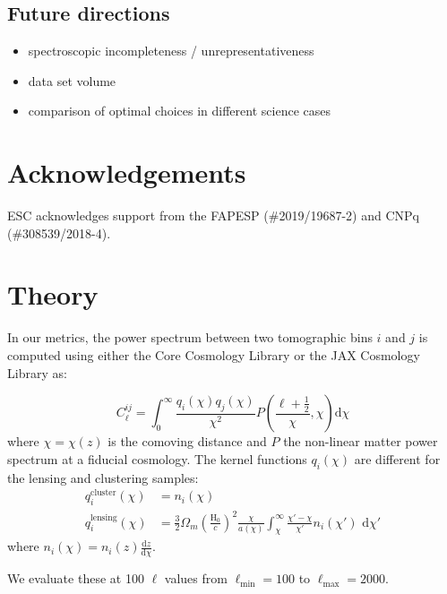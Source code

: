 \documentclass[twocolumn,twocolappendix]{aastex63}
\begin{document}
\subsection{Future directions}

\begin{itemize}
    \item spectroscopic incompleteness / unrepresentativeness
    \item data set volume
    \item comparison of optimal choices in different science cases
\end{itemize}


\section{Acknowledgements}
ESC acknowledges support from the FAPESP (\#2019/19687-2) and CNPq  (\#308539/2018-4).




\appendix

\section{Theory}\label{app:theory}

In our metrics, the power spectrum between two tomographic bins $i$ and $j$ is
computed using either the Core Cosmology Library \citep{ccl} or the JAX
Cosmology Library \citep{jax-cosmo} as:

\begin{equation}
    C^{ij}_\ell = \int_0^{\infty} \frac{q_i(\chi) q_j(\chi)}{\chi^2} P\left(\frac{\ell +\frac{1}{2}}{\chi}, \chi \right) \mathrm{d}\chi
\end{equation}
where $\chi = \chi(z)$ is the comoving distance and $P$ the non-linear matter power spectrum at
a fiducial cosmology.  The kernel functions $q_i(\chi)$ are different for the lensing and clustering samples:
\begin{align}
    q^{\mathrm{cluster}}_i(\chi) &= n_i(\chi)\\
    q^{\mathrm{lensing}}_i(\chi) &= \frac{3}{2}\Omega_m \left(\frac{\mathrm{H}_0}{c}\right)^2 \frac{\chi}{a(\chi)} \int_\chi^{\infty} \frac{\chi' - \chi}{\chi'} n_i(\chi')\,\,\mathrm{d}\chi'
\end{align}
where $n_i(\chi) = n_i(z) \frac{\mathrm{d}z}{\mathrm{d}\chi}$.

We evaluate these at 100 $\ell$ values from $\ell_\mathrm{min}=100$ to $\ell_\mathrm{max}=2000$.
\end{document}
